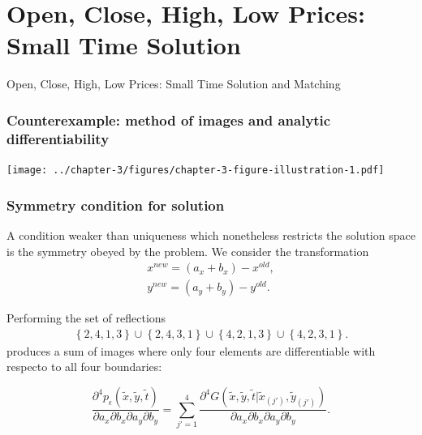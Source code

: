 \documentclass{beamer}
\begin{document}
\section{Open, Close, High, Low Prices: Small Time Solution}
\begin{frame}
Open, Close, High, Low Prices: Small Time Solution and Matching
\end{frame}
\begin{frame}
  \frametitle{Counterexample: method of images and analytic differentiability}
  \centering
  \texttt{[image: ../chapter-3/figures/chapter-3-figure-illustration-1.pdf]}
\end{frame}
\begin{frame}
  \frametitle{Symmetry condition for solution}

  A condition weaker than uniqueness which nonetheless restricts the
solution space is the symmetry obeyed by the problem. We consider the transformation
\begin{align*}
  x^{new} = (a_x + b_x) - x^{old}, \\
  y^{new} = (a_y + b_y) - y^{old}.
\end{align*}

Performing the set of reflections
\begin{align*}
  \left\{ 2,4,1,3 \right\} \cup \left\{ 2,4,3,1 \right\} \cup \left\{ 4,2,1,3 \right\} \cup \left\{ 4,2,3,1 \right\}. 
\end{align*}
produces a sum of images where only four elements are differentiable
with respecto to all four boundaries:

\[
  \frac{\partial^4 p_\epsilon(\tilde{x}, \tilde{y}, \tilde{t})}{\partial a_x \partial b_x \partial a_y \partial b_y}  = \sum_{j'=1}^{4}
                                                                                                                        \frac{\partial^4G(\tilde{x},\tilde{y},\tilde{t}|\tilde{x}_{(j')},\tilde{y}_{(j')})}{\partial a_x \partial b_x \partial a_y \partial b_y}.
\]

\end{frame}
\end{document}
